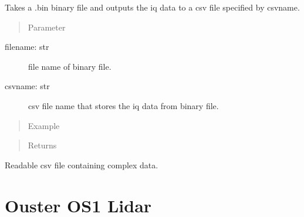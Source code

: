 \documentclass[letterpaper,10pt,english]{sphinxmanual}
\begin{document}
\begin{fulllineitems}
\label{\detokenize{TI radar:TI_parser.readTIdata}}
Takes a .bin binary file and outputs the iq data to a csv file specified by csvname.
\begin{quote}\begin{description}
\item[{Parameter}] \leavevmode
\end{description}\end{quote}
\begin{description}
\item[{filename: str}] \leavevmode
file name of binary file.

\item[{csvname: str}] \leavevmode
csv file name that stores the iq data from binary file.

\end{description}
\begin{quote}\begin{description}
\item[{Example}] \leavevmode
\end{description}\end{quote}

\begin{sphinxVerbatim}[commandchars=\\\{\}]
\end{sphinxVerbatim}
\begin{quote}\begin{description}
\item[{Returns}] \leavevmode


\end{description}\end{quote}

Readable csv file containing complex data.

\end{fulllineitems}



\section{Ouster OS1 Lidar}
\label{\detokenize{Ouster lidar:ouster-os1-lidar}}\label{\detokenize{Ouster lidar::doc}}
\end{document}

